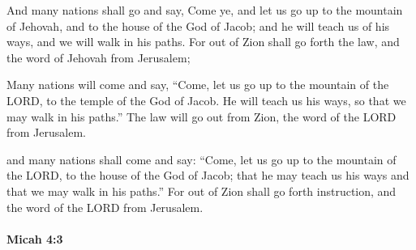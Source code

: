			\begin{versebox}
					\item[BHS] 
					\item[LXX] 
					\item[ASV] And many nations shall go and say, Come ye, and let us go up to the mountain of Jehovah, and to the house of the God of Jacob; and he will teach us of his ways, and we will walk in his paths. For out of Zion shall go forth the law, and the word of Jehovah from Jerusalem;
					\item[NIV] Many nations will come and say, “Come, let us go up to the mountain of the LORD, to the temple of the God of Jacob. He will teach us his ways, so that we may walk in his paths.” The law will go out from Zion, the word of the LORD from Jerusalem.
					\item[NRSV] and many nations shall come and say: “Come, let us go up to the mountain of the LORD, to the house of the God of Jacob; that he may teach us his ways and that we may walk in his paths.” For out of Zion shall go forth instruction, and the word of the LORD from Jerusalem.
			\end{versebox}

		\paragraph{Micah 4:3} %
			\label{MICAH-4-3}

